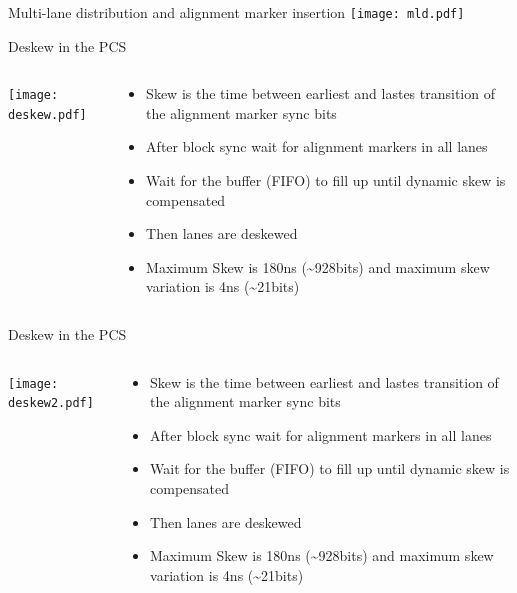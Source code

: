\documentclass[fleqn,11pt,aspectratio=169]{beamer}
\begin{document}
\begin{frame}{Multi-lane distribution and alignment marker insertion}
\texttt{[image: mld.pdf]}

\end{frame}

\begin{frame}{Deskew in the PCS}
\begin{columns} %
\begin{column}{.6\textwidth}
\texttt{[image: deskew.pdf]}
\end{column}
\begin{column}{.4\textwidth}
\begin{itemize}
\item Skew is the time between earliest and lastes transition of the alignment marker sync bits
\item After block sync wait for alignment markers in all lanes
\item Wait for the buffer (FIFO) to fill up until dynamic skew is compensated
\item Then lanes are deskewed
\item Maximum Skew is 180ns (\textasciitilde 928bits) and maximum skew variation is 4ns (\textasciitilde 21bits)
\end{itemize}
\end{column}
\end{columns}
\end{frame}

\begin{frame}{Deskew in the PCS}
\begin{columns} %
\begin{column}{.6\textwidth}
\texttt{[image: deskew2.pdf]}
\end{column}
\begin{column}{.4\textwidth}
\begin{itemize}
\item Skew is the time between earliest and lastes transition of the alignment marker sync bits
\item After block sync wait for alignment markers in all lanes
\item Wait for the buffer (FIFO) to fill up until dynamic skew is compensated
\item Then lanes are deskewed
\item Maximum Skew is 180ns (\textasciitilde 928bits) and maximum skew variation is 4ns (\textasciitilde 21bits)
\end{itemize}
\end{column}
\end{columns}
\end{frame}
\end{document}

